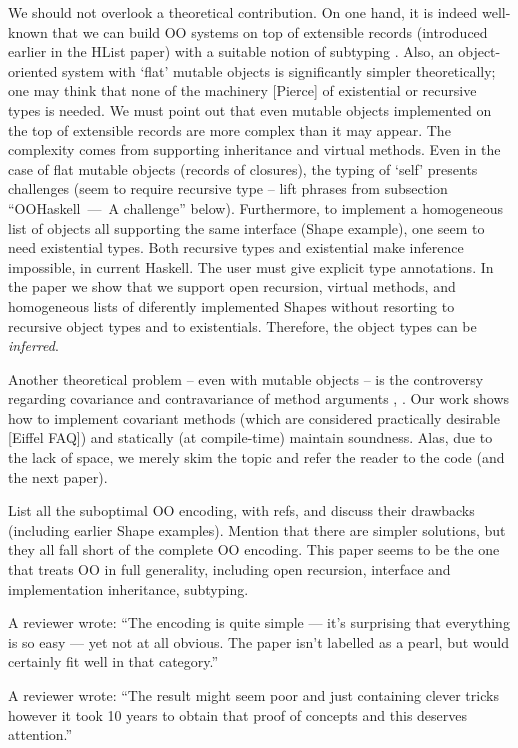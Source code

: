 We should not overlook a theoretical contribution. On one hand, it is
indeed well-known that we can build OO systems on top of extensible
records (introduced earlier in the HList paper) with a suitable notion
of subtyping \cite{Cardelli-on-understanding}. Also, an
object-oriented system with `flat' mutable objects is significantly
simpler theoretically; one may think that none of the machinery
[Pierce] of existential or recursive types is needed. We must point
out that even mutable objects implemented on the top of extensible
records are more complex than it may appear. The complexity comes from
supporting inheritance and virtual methods. Even in the case of flat
mutable objects (records of closures), the typing of `self' presents
challenges (seem to require recursive type -- lift phrases from
subsection ``{OOHaskell~---~A challenge}'' below). Furthermore, to implement
a homogeneous list of objects all supporting the same interface (Shape
example), one seem to need existential types. Both recursive types and
existential make inference impossible, in current Haskell. The user
must give explicit type annotations. In the paper we show that we
support open recursion, virtual methods, and homogeneous lists of
diferently implemented Shapes without resorting to recursive object
types and to existentials. Therefore, the object types can be
\emph{inferred}.

Another theoretical problem -- even with mutable objects -- is the
controversy regarding covariance and contravariance of method
arguments \cite{SG04}, \cite{catcall}. Our work shows how to implement
covariant methods (which are considered practically desirable [Eiffel
  FAQ]) and statically (at compile-time) maintain soundness. Alas, due
to the lack of space, we merely skim the topic and refer the reader to
the code (and the next paper).


List all the suboptimal OO encoding, with refs,
and discuss their drawbacks (including earlier Shape examples).
Mention that there are simpler solutions, but they all fall short of
the complete OO encoding. This paper seems to be the one that treats
OO in full generality, including open recursion, interface and
implementation inheritance, subtyping.

A reviewer wrote:
``The encoding is quite simple --- it's surprising that
everything is so easy --- yet not at all obvious. The paper isn't
labelled as a pearl, but would certainly fit well in that category.''

A reviewer wrote:
``The result might seem poor and just containing clever tricks
however it took 10 years to obtain that proof of concepts and this
deserves attention.''


